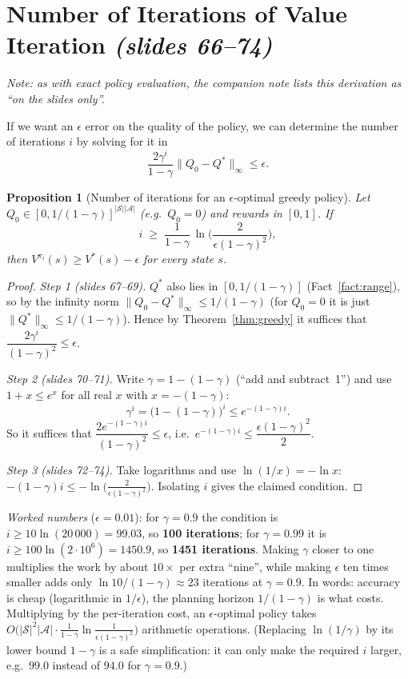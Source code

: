 \documentclass[11pt,a4paper]{article}
\newcommand{\cS}{\mathcal{S}}
\newcommand{\cA}{\mathcal{A}}
\newcommand{\norm}[1]{\lVert #1\rVert_\infty}
\newcommand{\slides}[1]{\texorpdfstring{\emph{(slides #1)}}{(slides #1)}}
\theoremstyle{plain}
\newtheorem{proposition}{Proposition}\renewcommand{\theproposition}{S\arabic{proposition}}
\theoremstyle{definition}
\theoremstyle{remark}
\begin{document}
\section{Number of Iterations of Value Iteration \slides{66--74}}\label{sec:iters}
\emph{Note: as with exact policy evaluation, the companion note lists this derivation as ``on the slides only''.}

If we want an $\epsilon$ error on the quality of the policy, we can determine the number of iterations $i$ by solving for it in
\[
\frac{2\gamma^i}{1-\gamma}\norm{Q_0-Q^*}\le\epsilon .
\]

\begin{proposition}[Number of iterations for an $\epsilon$-optimal greedy policy]\label{prop:iters}
Let $Q_0\in[0,1/(1-\gamma)]^{|\cS||\cA|}$ (e.g.\ $Q_0=0$) and rewards in $[0,1]$. If
\[
i\;\ge\;\frac{1}{1-\gamma}\,\ln\!\Big(\frac{2}{\epsilon(1-\gamma)^2}\Big),
\]
then $V^{\pi_i}(s)\ge V^*(s)-\epsilon$ for every state $s$.
\end{proposition}
\begin{proof}
\emph{Step 1 (slides 67--69).} $Q^*$ also lies in $[0,1/(1-\gamma)]$ (Fact~\ref{fact:range}), so by the infinity norm $\norm{Q_0-Q^*}\le1/(1-\gamma)$ (for $Q_0=0$ it is just $\norm{Q^*}\le1/(1-\gamma)$). Hence by Theorem~\ref{thm:greedy} it suffices that $\dfrac{2\gamma^i}{(1-\gamma)^2}\le\epsilon$.

\emph{Step 2 (slides 70--71).} Write $\gamma=1-(1-\gamma)$ (``add and subtract~1'') and use $1+x\le e^x$ for all real $x$ with $x=-(1-\gamma)$:
\[
\gamma^i=\big(1-(1-\gamma)\big)^i\le e^{-(1-\gamma)i}.
\]
So it suffices that $\dfrac{2e^{-(1-\gamma)i}}{(1-\gamma)^2}\le\epsilon$, i.e.\ $e^{-(1-\gamma)i}\le\dfrac{\epsilon(1-\gamma)^2}{2}$.

\emph{Step 3 (slides 72--74).} Take logarithms and use $\ln(1/x)=-\ln x$: $-(1-\gamma)i\le-\ln\!\big(\tfrac{2}{\epsilon(1-\gamma)^2}\big)$. Isolating $i$ gives the claimed condition.
\end{proof}

\begin{intuition}
\emph{Worked numbers} ($\epsilon=0.01$): for $\gamma=0.9$ the condition is $i\ge10\ln(20\,000)=99.03$, so \textbf{100 iterations}; for $\gamma=0.99$ it is $i\ge100\ln(2\cdot10^6)=1450.9$, so \textbf{1451 iterations}. Making $\gamma$ closer to one multiplies the work by about $10\times$ per extra ``nine'', while making $\epsilon$ ten times smaller adds only $\ln10/(1-\gamma)\approx23$ iterations at $\gamma=0.9$. In words: accuracy is cheap (logarithmic in $1/\epsilon$), the planning horizon $1/(1-\gamma)$ is what costs. Multiplying by the per-iteration cost, an $\epsilon$-optimal policy takes $O\big(|\cS|^2|\cA|\cdot\tfrac{1}{1-\gamma}\ln\tfrac1{\epsilon(1-\gamma)^2}\big)$ arithmetic operations. (Replacing $\ln(1/\gamma)$ by its lower bound $1-\gamma$ is a safe simplification: it can only make the required $i$ larger, e.g.\ $99.0$ instead of $94.0$ for $\gamma=0.9$.)
\end{intuition}
\end{document}
